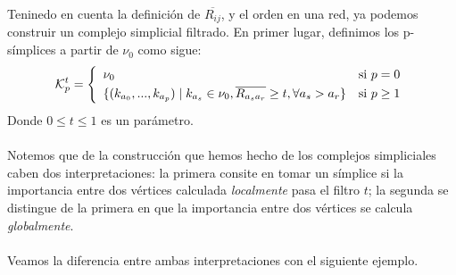 \documentclass[12pt, a4paper]{article}
\numberwithin{equation}{section}
\theoremstyle{definition}
\theoremstyle{remark}
\theoremstyle{plain}
\begin{document}
		Teninedo en cuenta la definición de $\overline{R_{ij}}$, y el orden en una red, ya podemos construir un complejo simplicial filtrado. 
		En primer lugar, definimos los p-símplices a partir de {\Large $\nu$}$_{0}$ como sigue:
		\begin{equation}
           		\mathcal{K}_{p}^{t}=
			\left \{
				\begin{array}{ll}
					{\Large \nu}_{0} & \text{si } p=0\\[3pt]
            				\{(k_{a_{0}},...,k_{a_{p}}) \mid k_{a_{s}} \in {\Large \nu}_{0}, \overline{R_{a_{s}a_{r}}} \geq t, 
					\forall a_{s} > a_{r} \} & \text{si } p \geq 1
				\end{array}
            		\right.  
			\label{def:sn}
        	\end{equation}
		Donde $0 \leq t \leq 1$ es un parámetro. \\
		\\
		Notemos que de la construcción que hemos hecho de los complejos simpliciales caben dos interpretaciones: la primera consite en tomar 
		un símplice si la importancia entre dos vértices calculada \emph{localmente} pasa el filtro $t$; la segunda se distingue 
		de la primera en que la importancia entre dos vértices se calcula \emph{globalmente}.\\
		\\
		Veamos la diferencia entre ambas interpretaciones con el siguiente ejemplo.
\end{document}
